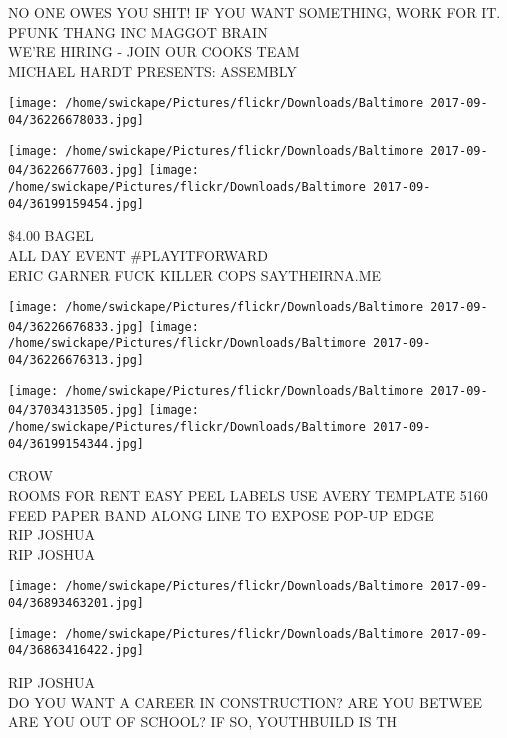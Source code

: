 \documentclass[10pt,letterpaper]{article}
\begin{document}
NO ONE OWES YOU SHIT!  IF YOU WANT SOMETHING, WORK FOR IT.\\
PFUNK THANG INC MAGGOT BRAIN\\
WE'RE HIRING {-} JOIN OUR COOKS TEAM\\
MICHAEL HARDT PRESENTS: ASSEMBLY\\
\pagebreak

\texttt{[image: /home/swickape/Pictures/flickr/Downloads/Baltimore 2017-09-04/36226678033.jpg]}

\vspace{0.25in}
\texttt{[image: /home/swickape/Pictures/flickr/Downloads/Baltimore 2017-09-04/36226677603.jpg]}
\texttt{[image: /home/swickape/Pictures/flickr/Downloads/Baltimore 2017-09-04/36199159454.jpg]}

\$4.00 BAGEL\\
ALL DAY EVENT \#PLAYITFORWARD\\
ERIC GARNER FUCK KILLER COPS SAYTHEIRNA.ME\\
\pagebreak

\texttt{[image: /home/swickape/Pictures/flickr/Downloads/Baltimore 2017-09-04/36226676833.jpg]}
\texttt{[image: /home/swickape/Pictures/flickr/Downloads/Baltimore 2017-09-04/36226676313.jpg]}

\texttt{[image: /home/swickape/Pictures/flickr/Downloads/Baltimore 2017-09-04/37034313505.jpg]}
\texttt{[image: /home/swickape/Pictures/flickr/Downloads/Baltimore 2017-09-04/36199154344.jpg]}

CROW\\
ROOMS FOR RENT EASY PEEL LABELS USE AVERY TEMPLATE 5160 FEED PAPER BAND ALONG LINE TO EXPOSE POP{-}UP EDGE\\
RIP JOSHUA\\
RIP JOSHUA\\
\pagebreak

\texttt{[image: /home/swickape/Pictures/flickr/Downloads/Baltimore 2017-09-04/36893463201.jpg]}

\vspace{0.25in}
\texttt{[image: /home/swickape/Pictures/flickr/Downloads/Baltimore 2017-09-04/36863416422.jpg]}

RIP JOSHUA\\
DO YOU WANT A CAREER IN CONSTRUCTION?  ARE YOU BETWEE  ARE YOU OUT OF SCHOOL?  IF SO, YOUTHBUILD IS TH\\
\pagebreak
\end{document}
